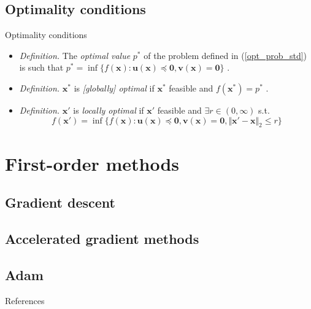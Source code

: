 \documentclass{beamer}
\numberwithin{equation}{section}
\newcommand{\aref}[1]{\alert{\ref{#1}}}
\begin{document}
\subsection{Optimality conditions}

\begin{frame}{Optimality conditions}
    \begin{itemize}
        \item
        \textit{Definition.} The \textit{optimal value} $ p^* $
        of the problem defined in (\aref{opt_prob_std}) is such that
        $ p^* = \inf\{f(\mathbf{x}) : \mathbf{u}(\mathbf{x}) \preceq
        \mathbf{0}, \mathbf{v}(\mathbf{x}) = \mathbf{0}\} $
        \cite{bv_convex_opt}.

        \item
        \textit{Definition.} $ \mathbf{x}^* $ is \textit{[globally] optimal}
        if $ \mathbf{x}^* $ feasible and $ f(\mathbf{x}^*) = p^* $
        \cite{bv_convex_opt}.

        \item
        \textit{Definition.} $ \mathbf{x}' $ is \textit{locally optimal} if
        $ \mathbf{x}' $ feasible and $ \exists r \in (0, \infty) $
        s.t. \cite{bv_convex_opt}
        \begin{equation*}
            f(\mathbf{x}') = \inf\{
                f(\mathbf{x}) : \mathbf{u}(\mathbf{x}) \preceq \mathbf{0},
                \mathbf{v}(\mathbf{x}) = \mathbf{0}, \Vert
                    \mathbf{x}' - \mathbf{x}
                \Vert_2 \le r
            \}
        \end{equation*}
    \end{itemize}
\end{frame}

\section{First-order methods}

\subsection{Gradient descent}

\subsection{Accelerated gradient methods}

\subsection{Adam}

\begin{frame}{References}
    
    
\end{frame}
\end{document}
